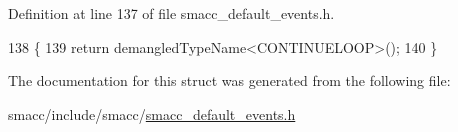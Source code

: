 Definition at line 137 of file smacc\+\_\+default\+\_\+events.\+h.


\begin{DoxyCode}
138   \{
139     \textcolor{keywordflow}{return} demangledTypeName<CONTINUELOOP>();
140   \}
\end{DoxyCode}


The documentation for this struct was generated from the following file\+:\begin{DoxyCompactItemize}
\item 
smacc/include/smacc/\hyperlink{smacc__default__events_8h}{smacc\+\_\+default\+\_\+events.\+h}\end{DoxyCompactItemize}
